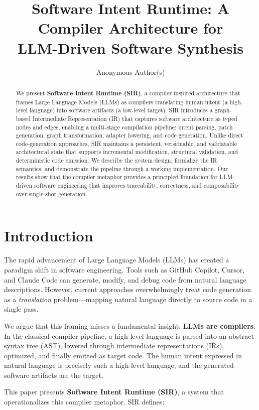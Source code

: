 \documentclass[11pt,a4paper]{article}
\title{Software Intent Runtime: A Compiler Architecture for\\LLM-Driven Software Synthesis}
\author{
  Anonymous Author(s)
}
\date{}
\begin{document}
\maketitle

\begin{abstract}
We present \textbf{Software Intent Runtime (SIR)}, a compiler-inspired architecture that frames Large Language Models (LLMs) as compilers translating human intent (a high-level language) into software artifacts (a low-level target). SIR introduces a graph-based Intermediate Representation (IR) that captures software architecture as typed nodes and edges, enabling a multi-stage compilation pipeline: intent parsing, patch generation, graph transformation, adapter lowering, and code generation. Unlike direct code-generation approaches, SIR maintains a persistent, versionable, and validatable architectural state that supports incremental modification, structural validation, and deterministic code emission. We describe the system design, formalize the IR semantics, and demonstrate the pipeline through a working implementation. Our results show that the compiler metaphor provides a principled foundation for LLM-driven software engineering that improves traceability, correctness, and composability over single-shot generation.
\end{abstract}

\section{Introduction}

The rapid advancement of Large Language Models (LLMs) has created a paradigm shift in software engineering. Tools such as GitHub Copilot, Cursor, and Claude Code can generate, modify, and debug code from natural language descriptions. However, current approaches overwhelmingly treat code generation as a \emph{translation} problem---mapping natural language directly to source code in a single pass.

We argue that this framing misses a fundamental insight: \textbf{LLMs are compilers}. In the classical compiler pipeline, a high-level language is parsed into an abstract syntax tree (AST), lowered through intermediate representations (IRs), optimized, and finally emitted as target code. The human intent expressed in natural language is precisely such a high-level language, and the generated software artifacts are the target.

This paper presents \textbf{Software Intent Runtime (SIR)}, a system that operationalizes this compiler metaphor. SIR defines:
\end{document}
